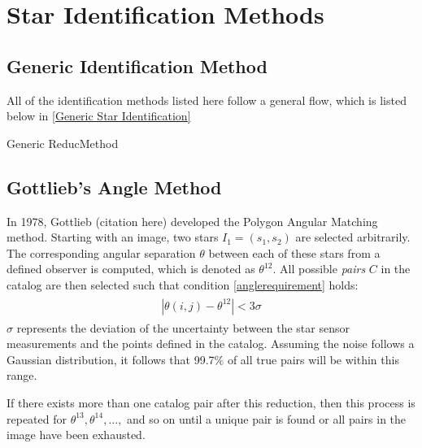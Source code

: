 \section{Star Identification Methods}


\subsection{Generic Identification Method}
All of the identification methods listed here follow a general flow, which is listed below in \eqref{Generic Star Identification}

\begin{algorithm}[H]
\caption{Generic ReducMethod}
\label{Generic Star Identification}
\begin{algorithmic}[1]
\Procedure{}{}
\EndProcedure
\end{algorithmic}
\end{algorithm}



\subsection{Gottlieb's Angle Method}
In 1978, Gottlieb (citation here) developed the Polygon Angular Matching method. Starting with an image, two stars $I_1 = (s_1, s_2)$ are selected arbitrarily. The corresponding angular separation $\theta$ between each of these stars from a defined observer is computed, which is denoted as $\theta^{12}$. All possible \textit{pairs} $C$ in the catalog are then selected such that condition \eqref{anglerequirement} holds:
\begin{align}
\label{anglerequirement}
\begin{split}
| \theta(i, j) - \theta^{12} | < 3 \sigma
\end{split}
\end{align}
$\sigma$ represents the deviation of the uncertainty between the star sensor measurements and the points defined in the catalog. Assuming the noise follows a Gaussian distribution, it follows that 99.7\% of all true pairs will be within this range.

If there exists more than one catalog pair after this reduction, then this process is repeated for $\theta^{13}, \theta^{14}, ...,$ and so on until a unique pair is found or all pairs in the image have been exhausted. 

